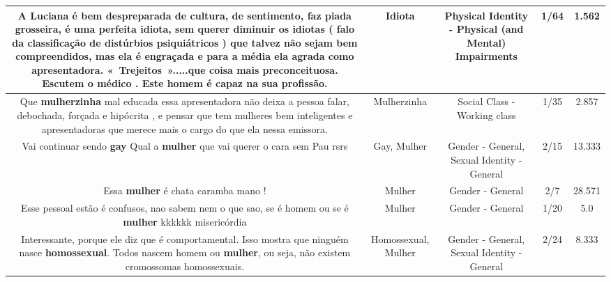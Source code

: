 \documentclass[11pt]{article}
\newlength\mylength
\begin{document}
\begin{center}
\begin{longtable}{|C{.65\mylength}|C{.30\mylength}|C{.12\mylength}|C{.12\mylength}|C{.12\mylength}|}
  \small A Luciana é bem despreparada de cultura, de sentimento, faz piada grosseira, é uma perfeita \textbf{idiota}, sem querer diminuir os idiotas ( falo da classificação de distúrbios psiquiátricos ) que talvez não sejam bem compreendidos, mas ela é engraçada e para a média ela agrada como apresentadora. « Trejeitos ».....que coisa mais preconceituosa. Escutem o médico . Este homem é capaz na sua profissão.\normalsize   & Idiota & Physical Identity - Physical (and Mental) Impairments & 1/64 & 1.562 \\  \hline
  \small Que \textbf{mulherzinha} mal educada essa apresentadora não deixa a pessoa falar, debochada, forçada e hipócrita , e pensar que tem mulheres bem inteligentes e apresentadoras que merece mais o cargo do que ela nessa emissora.\normalsize   & Mulherzinha & Social Class - Working class & 1/35 & 2.857 \\  \hline
  \small Vai continuar sendo \textbf{gay} Qual a \textbf{mulher} que vai querer o cara sem Pau rsrs\normalsize   & Gay, Mulher & Gender - General, Sexual Identity - General & 2/15 & 13.333 \\  \hline
  \small Essa \textbf{mulher} é chata caramba mano !\normalsize   & Mulher & Gender - General & 2/7 & 28.571 \\  \hline
  \small Esse pessoal estão é confusos, nao sabem nem o que sao, se é homem ou se é \textbf{mulher} kkkkkk misericórdia\normalsize   & Mulher & Gender - General & 1/20 & 5.0 \\  \hline
  \small Interessante, porque ele diz que é comportamental. Isso mostra que ninguém nasce \textbf{homossexual}. Todos nascem homem ou \textbf{mulher}, ou seja, não existem cromossomas homossexuais.\normalsize   & Homossexual, Mulher & Gender - General, Sexual Identity - General & 2/24 & 8.333 \\  \hline

\end{longtable}
\end{center}
\end{document}
